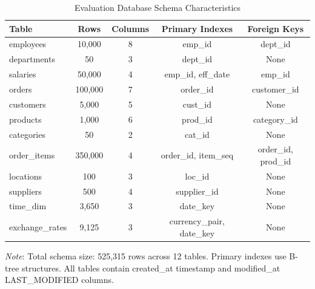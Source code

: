 \begin{table}[h]
\centering
\caption{Evaluation Database Schema Characteristics}
\label{tab:schema_characteristics}
\footnotesize
\begin{tabular}{lcccc}
\toprule
\textbf{Table} & \textbf{Rows} & \textbf{Columns} & \textbf{Primary Indexes} & \textbf{Foreign Keys} \\
\midrule
employees & 10,000 & 8 & emp\_id & dept\_id \\
departments & 50 & 3 & dept\_id & None \\
salaries & 50,000 & 4 & emp\_id, eff\_date & emp\_id \\
orders & 100,000 & 7 & order\_id & customer\_id \\
customers & 5,000 & 5 & cust\_id & None \\
products & 1,000 & 6 & prod\_id & category\_id \\
categories & 50 & 2 & cat\_id & None \\
order\_items & 350,000 & 4 & order\_id, item\_seq & order\_id, prod\_id \\
locations & 100 & 3 & loc\_id & None \\
suppliers & 500 & 4 & supplier\_id & None \\
time\_dim & 3,650 & 3 & date\_key & None \\
exchange\_rates & 9,125 & 3 & currency\_pair, date\_key & None \\
\bottomrule
\end{tabular}

\footnotesize
\textit{Note}: Total schema size: 525,315 rows across 12 tables. Primary indexes use B-tree structures. All tables contain created\_at timestamp and modified\_at LAST\_MODIFIED columns.
\end{table}
